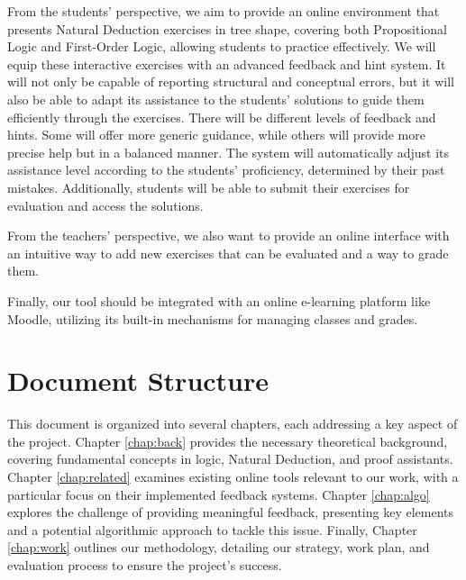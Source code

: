 From the students' perspective, we aim to provide an online environment that presents Natural Deduction exercises in tree shape, covering both Propositional Logic and First-Order Logic, allowing students to practice effectively. We will equip these interactive exercises with an advanced feedback and hint system. It will not only be capable of reporting structural and conceptual errors, but it will also be able to adapt its assistance to the students' solutions to guide them efficiently through the exercises. There will be different levels of feedback and hints. Some will offer more generic guidance, while others will provide more precise help but in a balanced manner. The system will automatically adjust its assistance level according to the students' proficiency, determined by their past mistakes. Additionally, students will be able to submit their exercises for evaluation and access the solutions.

From the teachers' perspective, we also want to provide an online interface with an intuitive way to add new exercises that can be evaluated and a way to grade them.

Finally, our tool should be integrated with an online e-learning platform like Moodle, utilizing its built-in mechanisms for managing classes and grades.

\section{Document Structure}

This document is organized into several chapters, each addressing a key aspect of the project. Chapter \ref{chap:back} provides the necessary theoretical background, covering fundamental concepts in logic, Natural Deduction, and proof assistants. Chapter \ref{chap:related} examines existing online tools relevant to our work, with a particular focus on their implemented feedback systems. Chapter \ref{chap:algo} explores the challenge of providing meaningful feedback, presenting key elements and a potential algorithmic approach to tackle this issue. Finally, Chapter \ref{chap:work} outlines our methodology, detailing our strategy, work plan, and evaluation process to ensure the project's success.

\endgroup
